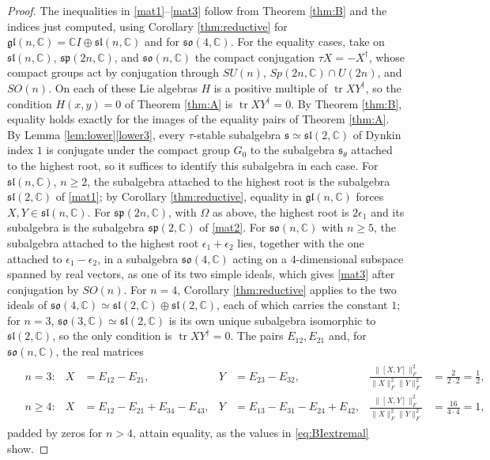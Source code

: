 \documentclass[leqno,10pt]{amsart}
\theoremstyle{definition}
\numberwithin{equation}{section}
\newcommand{\so}{\mathfrak{so}}
\renewcommand{\sp}{\mathfrak{sp}}
\newcommand{\ep}{\epsilon}
\newcommand{\gl}{\mathfrak{gl}}
\newcommand{\sll}{\mathfrak{sl}}
\newcommand{\com}{\mathbb C}
\newcommand{\tr}{\operatorname{tr}}
\newcommand{\fnorm}[1]{\lVert #1\rVert_{F}}
\newcommand{\subs}{\mathfrak{s}}
\begin{document}
\begin{proof}
The inequalities in \ref{mat1}--\ref{mat3} follow from Theorem \ref{thm:B} and the indices just computed, using Corollary \ref{thm:reductive} for $\gl(n, \com) = \com I \oplus \sll(n, \com)$ and for $\so(4, \com)$. For the equality cases, take on $\sll(n, \com)$, $\sp(2n, \com)$, and $\so(n, \com)$ the compact conjugation $\tau X = -X^{\dagger}$, whose compact groups act by conjugation through $SU(n)$, $Sp(2n, \com) \cap U(2n)$, and $SO(n)$. On each of these Lie algebras $H$ is a positive multiple of $\tr XY^{\dagger}$, so the condition $H(x, y) = 0$ of Theorem \ref{thm:A} is $\tr XY^{\dagger} = 0$. By Theorem \ref{thm:B}, equality holds exactly for the images of the equality pairs of Theorem \ref{thm:A}. By Lemma \ref{lem:lower}\ref{lower3}, every $\tau$-stable subalgebra $\subs \simeq \sll(2, \com)$ of Dynkin index $1$ is conjugate under the compact group $G_{0}$ to the subalgebra $\subs_{\theta}$ attached to the highest root, so it suffices to identify this subalgebra in each case. For $\sll(n, \com)$, $n \geq 2$, the subalgebra attached to the highest root is the subalgebra $\sll(2, \com)$ of \ref{mat1}; by Corollary \ref{thm:reductive}, equality in $\gl(n, \com)$ forces $X, Y \in \sll(n, \com)$. For $\sp(2n, \com)$, with $\Omega$ as above, the highest root is $2\ep_{1}$ and its subalgebra is the subalgebra $\sp(2, \com)$ of \ref{mat2}. For $\so(n, \com)$ with $n \geq 5$, the subalgebra attached to the highest root $\ep_{1} + \ep_{2}$ lies, together with the one attached to $\ep_{1} - \ep_{2}$, in a subalgebra $\so(4, \com)$ acting on a $4$-dimensional subspace spanned by real vectors, as one of its two simple ideals, which gives \ref{mat3} after conjugation by $SO(n)$. For $n = 4$, Corollary \ref{thm:reductive} applies to the two ideals of $\so(4, \com) \simeq \sll(2, \com) \oplus \sll(2, \com)$, each of which carries the constant $1$; for $n = 3$, $\so(3, \com) \simeq \sll(2, \com)$ is its own unique subalgebra isomorphic to $\sll(2, \com)$, so the only condition is $\tr XY^{\dagger} = 0$. The pairs $E_{12}, E_{21}$ and, for $\so(n, \com)$, the real matrices
\begin{align}\label{eq:BIextremal}
\begin{aligned}
&n = 3: & X &= E_{12} - E_{21}, & Y &= E_{23} - E_{32}, & \frac{\fnorm{[X, Y]}^{2}}{\fnorm{X}^{2}\fnorm{Y}^{2}} &= \frac{2}{2\cdot 2} = \frac{1}{2},\\
&n \geq 4: & X &= E_{12} - E_{21} + E_{34} - E_{43}, & Y &= E_{13} - E_{31} - E_{24} + E_{42}, & \frac{\fnorm{[X, Y]}^{2}}{\fnorm{X}^{2}\fnorm{Y}^{2}} &= \frac{16}{4\cdot 4} = 1,
\end{aligned}
\end{align}
padded by zeros for $n > 4$, attain equality, as the values in \eqref{eq:BIextremal} show.


\end{proof}
\end{document}
